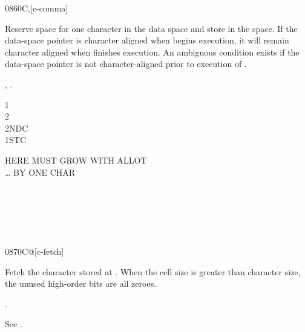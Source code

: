 \begin{worddef}{0860}{C,}[c-comma]
\item {}

	Reserve space for one character in the data space and store
	 in the space. If the data-space pointer is character
	aligned when  begins execution, it will remain character
	aligned when  finishes execution.
	An ambiguous condition exists if the data-space pointer is not
	character-aligned prior to execution of .

\see {},
	.

	\begin{testing} %
		\ttfamily
		 1  \\
		 2  \\
		 2NDC \\
		 1STC

			 HERE MUST GROW WITH ALLOT \\
				 {\ldots} BY ONE CHAR \\
		 \\
		 \\
		 \\
		 \\
		 \\
	\end{testing}
\end{worddef}


\begin{worddef}{0870}{C@}[c-fetch]
\item {}

	Fetch the character stored at . When the cell size is
	greater than character size, the unused high-order bits are all
	zeroes.

\see {}.

	\begin{testing} %
		See .
	\end{testing}
\end{worddef}


